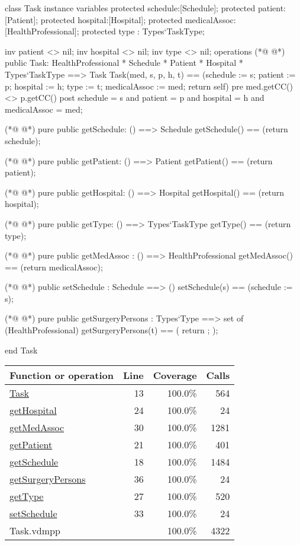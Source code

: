 \begin{vdmpp}[breaklines=true]
class Task
instance variables
  protected schedule:[Schedule];
  protected patient:[Patient];
  protected hospital:[Hospital];
  protected medicalAssoc:[HealthProfessional];
  protected type : Types`TaskType;
  
  inv patient <> nil;
  inv hospital <> nil;
  inv type <> nil;
operations
(*@
\label{Task:13}
@*)
 public Task: HealthProfessional * Schedule * Patient * Hospital * Types`TaskType ==> Task
  Task(med, s, p, h, t) == (schedule := s; patient := p; hospital := h; type := t; medicalAssoc := med; return self)
 pre med.getCC() <> p.getCC()
 post schedule = s and patient = p and hospital = h and medicalAssoc = med;
 
(*@
\label{getSchedule:18}
@*)
 pure public getSchedule: () ==> Schedule
  getSchedule() == (return schedule);
  
(*@
\label{getPatient:21}
@*)
 pure public getPatient: () ==> Patient
  getPatient() == (return patient);
  
(*@
\label{getHospital:24}
@*)
 pure public getHospital: () ==> Hospital
  getHospital() == (return hospital);
  
(*@
\label{getType:27}
@*)
 pure public getType: () ==> Types`TaskType
  getType() == (return type);
  
(*@
\label{getMedAssoc:30}
@*)
 pure public getMedAssoc : () ==> HealthProfessional
  getMedAssoc() == (return medicalAssoc);
  
(*@
\label{setSchedule:33}
@*)
 public setSchedule : Schedule ==> ()
  setSchedule(s) == (schedule := s);
  
(*@
\label{getSurgeryPersons:36}
@*)
 pure public getSurgeryPersons : Types`Type ==> set of (HealthProfessional)
  getSurgeryPersons(t) == ( return {}; );

end Task
\end{vdmpp}
\bigskip
\begin{longtable}{|l|r|r|r|}
\hline
Function or operation & Line & Coverage & Calls \\
\hline
\hline
\hyperref[Task:13]{Task} & 13&100.0\% & 564 \\
\hline
\hyperref[getHospital:24]{getHospital} & 24&100.0\% & 24 \\
\hline
\hyperref[getMedAssoc:30]{getMedAssoc} & 30&100.0\% & 1281 \\
\hline
\hyperref[getPatient:21]{getPatient} & 21&100.0\% & 401 \\
\hline
\hyperref[getSchedule:18]{getSchedule} & 18&100.0\% & 1484 \\
\hline
\hyperref[getSurgeryPersons:36]{getSurgeryPersons} & 36&100.0\% & 24 \\
\hline
\hyperref[getType:27]{getType} & 27&100.0\% & 520 \\
\hline
\hyperref[setSchedule:33]{setSchedule} & 33&100.0\% & 24 \\
\hline
\hline
Task.vdmpp & & 100.0\% & 4322 \\
\hline
\end{longtable}

